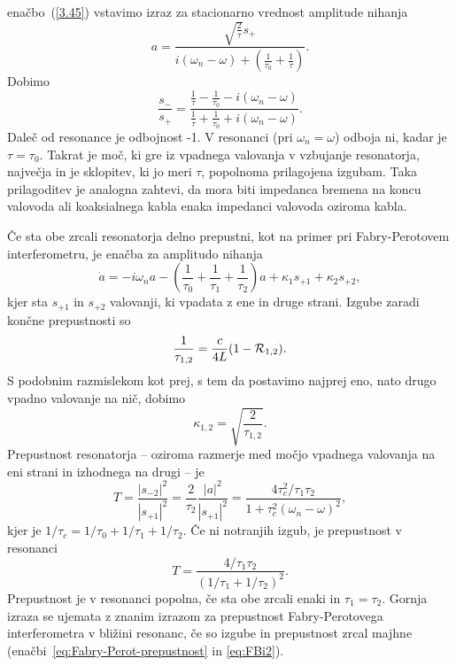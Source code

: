 enačbo~(\ref{3.45}) vstavimo izraz za stacionarno vrednost amplitude
nihanja 
\begin{equation}
a=\frac{\sqrt{\frac{2}{\tau}}s_{+}}{i(\omega_{n}-\omega)+(\frac{1}{\tau_{0}}+
\frac{1}{\tau})}.
\label{3.47}
\end{equation}
Dobimo
\begin{equation}
\frac{s_{-}}{s_{+}}=\frac{\frac{1}{\tau}-\frac{1}{\tau_0}-i(\omega_{n}-\omega)}
{\frac{1}{\tau}
+\frac{1}{\tau_0}+i(\omega_{n}-\omega)}.
\label{3.48}
\end{equation}
Daleč od resonance je odbojnost -1. V resonanci (pri $\omega_{n}=\omega$)
odboja ni, kadar je $\tau=\tau_{0}$. Takrat je moč, ki gre iz
vpadnega valovanja v vzbujanje resonatorja, največja in je sklopitev,
ki jo meri $\tau$, popolnoma prilagojena izgubam. Taka prilagoditev
je analogna zahtevi, da mora biti impedanca bremena na koncu valovoda
ali koaksialnega kabla enaka impedanci valovoda oziroma kabla.

Če sta obe zrcali resonatorja delno prepustni, kot na primer pri 
Fabry-Perotovem interferometru, je enačba za amplitudo nihanja 
\begin{equation}
\dot{a}=-i\omega_{n}a-\left(\frac{1}{\tau_{0}}+\frac{1}{\tau_{1}}+\frac{1}{\tau_{2}}\right)
a+\kappa_{1}s_{+1}+\kappa_{2}s_{+2},
\label{3.49}
\end{equation}
 kjer sta $s_{+1}$ in $s_{+2}$ valovanji, ki vpadata z ene in druge strani.
Izgube zaradi končne prepustnosti so
\begin{equation}
\frac{1}{\tau_{1,2}}=\frac{c}{4L}(1-{\cal R}_{1,2}).\label{3.50}
\end{equation}
S podobnim razmislekom kot prej, s tem da postavimo najprej eno, nato drugo
vpadno valovanje na nič, dobimo 
\begin{equation}
\kappa_{1,2}=\sqrt{\frac{2}{\tau_{1,2}}}.
\label{3.51}
\end{equation}
Prepustnost resonatorja -- oziroma razmerje med močjo vpadnega valovanja
na eni strani in izhodnega na drugi -- je
\begin{equation}
T=\frac{|s_{-2}|^{2}}{|s_{+1}|^{2}}=\frac{2}{\tau_{2}}\frac{|a|^{2}}{|s_{+1}|^{2}}=\frac{4\tau_c^{2}/
\tau_{1}\tau_{2}}{1+\tau_c^{2}(\omega_{n}-\omega)^{2}},
\label{3.52}
\end{equation}
 kjer je $1/\tau_c=1/\tau_{0}+1/\tau_{1}+1/\tau_{2}$. 
 Če ni notranjih izgub, je prepustnost v resonanci 
\begin{equation}
T=\frac{4/\tau_{1}\tau_{2}}{(1/\tau_{1}+1/\tau_{2})^{2}}.
\label{3.53}
\end{equation}
Prepustnost je v resonanci popolna, če sta obe zrcali enaki in $\tau_{1}=\tau_{2}$.
Gornja izraza se ujemata z znanim izrazom 
za prepustnost Fabry-Perotovega interferometra v bližini resonanc,
če so izgube in prepustnost zrcal majhne (enačbi~\ref{eq:Fabry-Perot-prepustnost} 
in \ref{eq:FBi2}). 

